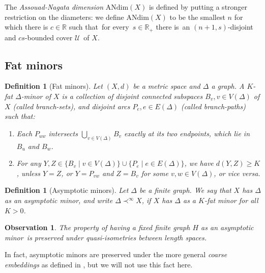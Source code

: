 \documentclass[a4paper]{article}
\newcommand{\defi}[1]{{\color{darkgray}\emph{#1}}}
\newtheorem{definition}[proposition]{Definition}
\newtheorem{observation}[proposition]{Observation}
\newcommand{\R}{\ensuremath{\mathbb R}}
\newcommand{\cu}{\ensuremath{\mathcal U}}
\newcommand{\fe}{for every}
\newcommand{\st}{such that}
\newcommand{\ti}{there is}
\newcommand{\andim}{\ensuremath{\mathrm{ANdim}}}
\newcommand{\asmi}{asymptotic minor}
\newtheorem{Def}{Definition}
\begin{document}
The \defi{Assouad-Nagata dimension} $\andim(X)$ is defined by putting a stronger restriction on the diameters: we define $\andim(X)$  to be the smallest $n$ for which there is $c\in \R$ \st\ \fe\ $s\in \R_+$ \ti\ an $(n+1,s)$-disjoint and $cs$-bounded cover \cu\ of $X$.


\subsection{Fat minors} \label{sec FM}

\begin{Def}[Fat minors] \label{def fat}
Let $(X,d)$ be a metric space and $\Delta$ a graph. A $K$-\defi{fat} $\Delta$-\defi{minor} of $X$ is a collection of disjoint connected subspaces $B_v, v\in V(\Delta)$ of $X$ (called \defi{branch-sets}), 
and disjoint arcs $P_e,e\in E(\Delta)$ (called \defi{branch-paths}) such that:
\begin{enumerate}
\item \label{fm i} Each  $P_{uw}$ intersects $\bigcup_{v\in V(\Delta)} B_v$ exactly at its two endpoints, which lie in $B_u$ and $B_w$.

\item \label{fm ii} For any $Y,Z \in \{ B_v \mid v\in V(\Delta) \}\cup  \{P_e \mid e\in E(\Delta)\}$, we have $d(Y,Z)\geq K$, unless $Y=Z$, or $Y=P_{vw}$ and $Z=B_v$ for some $v,w\in V(\Delta)$, or vice versa.
\end{enumerate}
\end{Def}

\begin{definition}[Asymptotic minors] \label{def asym}
Let $\Delta$ be a finite graph. We say that $X$ has $\Delta$ as an \defi{asymptotic  minor}, and write $\Delta \prec^\infty X$,  if $X$ has $\Delta $ as a $K$-fat minor  for all $K>0$. \end{definition}

\begin{observation} \label{invariance}
The property of having a fixed finite graph $H$ as an \asmi\ is preserved under quasi-isometries between length spaces.
\end{observation}

In fact, \asmi s are preserved under the more general \defi{coarse embeddings} as defined in \cite{GroAsyInv,Ostrovskii}, but we will not use this fact here.
\end{document}
